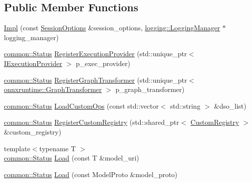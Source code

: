 \subsection*{Public Member Functions}
\begin{DoxyCompactItemize}
\item 
\mbox{\hyperlink{classonnxruntime_1_1InferenceSession_1_1Impl_a27d5ce43614c5f4d516d32aa1819fbe8}{Impl}} (const \mbox{\hyperlink{structonnxruntime_1_1SessionOptions}{Session\+Options}} \&session\+\_\+options, \mbox{\hyperlink{classonnxruntime_1_1logging_1_1LoggingManager}{logging\+::\+Logging\+Manager}} $\ast$logging\+\_\+manager)
\item 
\mbox{\hyperlink{classonnxruntime_1_1common_1_1Status}{common\+::\+Status}} \mbox{\hyperlink{classonnxruntime_1_1InferenceSession_1_1Impl_a2329171369e856d21eaa8b3248a69b34}{Register\+Execution\+Provider}} (std\+::unique\+\_\+ptr$<$ \mbox{\hyperlink{classonnxruntime_1_1IExecutionProvider}{I\+Execution\+Provider}} $>$ p\+\_\+exec\+\_\+provider)
\item 
\mbox{\hyperlink{classonnxruntime_1_1common_1_1Status}{common\+::\+Status}} \mbox{\hyperlink{classonnxruntime_1_1InferenceSession_1_1Impl_a52f42147ab47d1f7666dffdf9901d292}{Register\+Graph\+Transformer}} (std\+::unique\+\_\+ptr$<$ \mbox{\hyperlink{classonnxruntime_1_1GraphTransformer}{onnxruntime\+::\+Graph\+Transformer}} $>$ p\+\_\+graph\+\_\+transformer)
\item 
\mbox{\hyperlink{classonnxruntime_1_1common_1_1Status}{common\+::\+Status}} \mbox{\hyperlink{classonnxruntime_1_1InferenceSession_1_1Impl_a73681a754307a7fbd0367b35651c40e4}{Load\+Custom\+Ops}} (const std\+::vector$<$ std\+::string $>$ \&dso\+\_\+list)
\item 
\mbox{\hyperlink{classonnxruntime_1_1common_1_1Status}{common\+::\+Status}} \mbox{\hyperlink{classonnxruntime_1_1InferenceSession_1_1Impl_a5702a9154033b9e5c1a9a3956050e1fb}{Register\+Custom\+Registry}} (std\+::shared\+\_\+ptr$<$ \mbox{\hyperlink{classonnxruntime_1_1CustomRegistry}{Custom\+Registry}} $>$ \&custom\+\_\+registry)
\item 
{\footnotesize template$<$typename T $>$ }\\\mbox{\hyperlink{classonnxruntime_1_1common_1_1Status}{common\+::\+Status}} \mbox{\hyperlink{classonnxruntime_1_1InferenceSession_1_1Impl_a5b92cc49f13c0d6be9f61fb0ac5bf8ac}{Load}} (const T \&model\+\_\+uri)
\item 
\mbox{\hyperlink{classonnxruntime_1_1common_1_1Status}{common\+::\+Status}} \mbox{\hyperlink{classonnxruntime_1_1InferenceSession_1_1Impl_ac3b5439b50b8f9a67c792e4f43eeba9a}{Load}} (const Model\+Proto \&model\+\_\+proto)

\end{DoxyCompactItemize}
